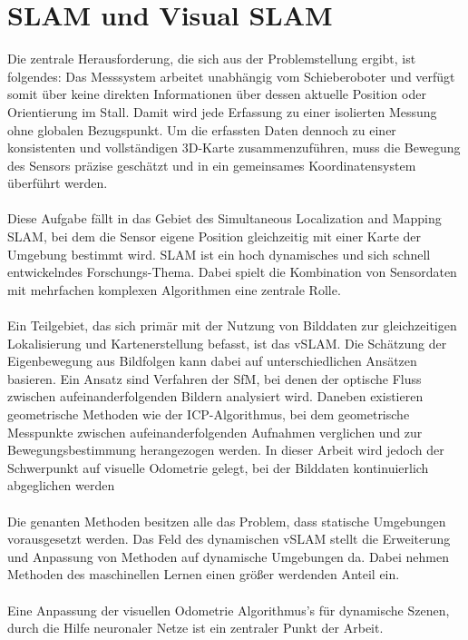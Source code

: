 \documentclass[12pt,DIV=15,BCOR=15mm,twoside,headsepline,abstract=true,listof=totoc,bibliography=totoc]{scrreprt}
\theoremstyle{remark}    %
\begin{document}
    \section{SLAM und Visual SLAM}
    Die zentrale Herausforderung, die sich aus der Problemstellung ergibt, ist folgendes:
    Das Messsystem arbeitet unabhängig vom Schieberoboter und verfügt somit über keine direkten Informationen über dessen aktuelle Position oder 
    Orientierung im Stall. Damit wird jede Erfassung zu einer isolierten Messung ohne globalen Bezugspunkt.
    Um die erfassten Daten dennoch zu einer konsistenten und vollständigen 3D-Karte zusammenzuführen, muss die Bewegung des Sensors präzise geschätzt 
    und in ein gemeinsames Koordinatensystem überführt werden.\\\\
    Diese Aufgabe fällt in das Gebiet des Simultaneous Localization and Mapping \ac{SLAM}, bei dem die Sensor eigene Position gleichzeitig mit einer 
    Karte der Umgebung bestimmt wird. \ac{SLAM} ist ein hoch dynamisches und sich schnell entwickelndes Forschungs-Thema. Dabei spielt die Kombination 
    von Sensordaten mit mehrfachen komplexen Algorithmen eine zentrale Rolle.\\\\
    Ein Teilgebiet, das sich primär mit der Nutzung von Bilddaten zur gleichzeitigen Lokalisierung und Kartenerstellung befasst, ist das \ac{vSLAM}.
    Die Schätzung der Eigenbewegung aus Bildfolgen kann dabei auf unterschiedlichen Ansätzen basieren.
    Ein Ansatz sind Verfahren der \ac{SfM}, bei denen der optische Fluss zwischen aufeinanderfolgenden Bildern analysiert wird.
    Daneben existieren geometrische Methoden wie der \ac{ICP}-Algorithmus, bei dem geometrische Messpunkte zwischen aufeinanderfolgenden Aufnahmen verglichen 
    und zur Bewegungsbestimmung herangezogen werden.
    In dieser Arbeit wird jedoch der Schwerpunkt auf visuelle Odometrie gelegt, bei der Bilddaten kontinuierlich abgeglichen werden \cite{10577209}\\\\
    Die genanten Methoden besitzen alle das Problem, dass statische Umgebungen vorausgesetzt werden. Das Feld des dynamischen \ac{vSLAM} stellt die Erweiterung 
    und Anpassung von Methoden auf dynamische Umgebungen da. Dabei nehmen Methoden des maschinellen Lernen einen größer werdenden Anteil ein.\cite{10577209}\\\\
    Eine Anpassung der visuellen Odometrie Algorithmus's für dynamische Szenen, durch die Hilfe neuronaler Netze ist ein zentraler Punkt der Arbeit.\\\\
\end{document}

